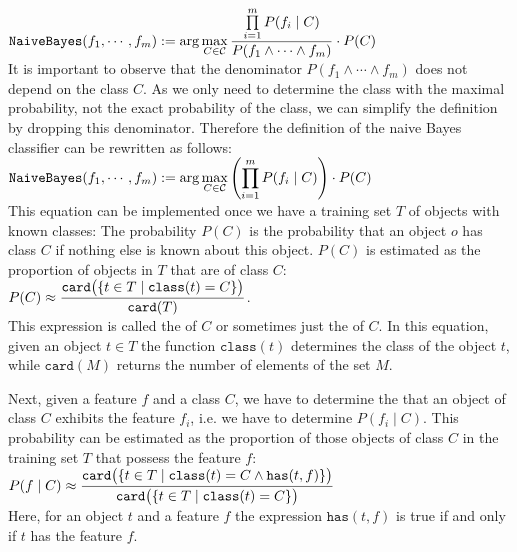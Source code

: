 \\[0.3cm]
\hspace*{1.3cm}
$\displaystyle \texttt{NaiveBayes}(f_1,\cdots,f_m) :=
  \arg\max\limits_{C \in \mathcal{C}}  \frac{\prod\limits_{i=1}^m P(f_i \;|\; C)}{P(f_1 \wedge \cdots \wedge f_m)} \cdot P(C) 
$
\\[0.3cm]
It is important to observe that the denominator $P(f_1 \wedge \cdots \wedge f_m)$ does not depend on the class
$C$.  As we only need to determine the class with the maximal probability, not the exact probability of the
class, we can simplify the definition by dropping this denominator.  Therefore the definition of the naive
Bayes classifier can be rewritten as follows:
\\[0.2cm]
\hspace*{1.3cm}
$\displaystyle \texttt{NaiveBayes}(f_1,\cdots,f_m) :=
  \arg\max\limits_{C \in \mathcal{C}}  \left(\prod\limits_{i=1}^m P(f_i \;|\; C)\right) \cdot P(C) 
$
\\[0.2cm]
This equation can be implemented once we have a training set $T$ of objects with known classes:  
The probability $P(C)$ is the probability that an object $o$ has class $C$
if nothing else is known about this object.  $P(C)$ is estimated as the proportion of objects in $T$ that are
of class $C$:
\\[0.2cm]
\hspace*{1.3cm}
$ \displaystyle P(C) \approx \frac{\texttt{card}\bigl(\{t \in T \;|\; \texttt{class}(t) = C \}\bigr)}{\texttt{card}(T)}$.
\\[0.2cm]
This expression is called the  of $C$ or sometimes just the  of $C$.
In this equation, given an object $t\in T$ the function $\texttt{class}(t)$ determines the class of the object
$t$, while $\texttt{card}(M)$ returns the number of elements of the set $M$.

Next, given a feature $f$ and a class $C$, we have to determine the  that an
object of class $C$ exhibits the feature $f_i$, i.e. we have to determine $P(f_i \;|\; C)$.
This probability can be estimated as the proportion of those objects of class $C$ in the training set $T$ that
possess the feature $f$:
\\[0.2cm]
\hspace*{1.3cm}
$\displaystyle P(f\;|\;C) \approx 
 \frac{\texttt{card}\bigl(\{t \in T \;|\; \texttt{class}(t) = C \wedge \texttt{has}(t, f) \}\bigr)}{
       \texttt{card}\bigl(\{t \in T \;|\; \texttt{class}(t) = C \}\bigr)} 
$
\\[0.2cm]
Here, for an object $t$ and a feature $f$ the expression $\texttt{has}(t, f)$ is true if and only if $t$ has
the feature $f$.

